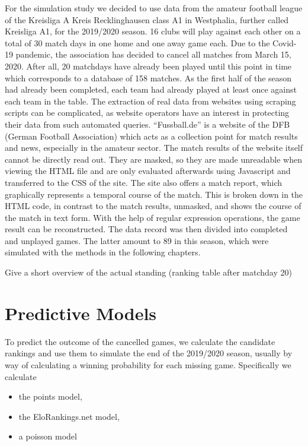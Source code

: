 \documentclass[12pt,a4paper]{article}
\begin{document}
For the simulation study we decided to use data from the amateur
football league of the Kreisliga A Kreis Recklinghausen class A1 in
Westphalia, further called Kreisliga A1, for the 2019/2020 season. 16
clubs will play against each other on a total of 30 match days in one
home and one away game each. Due to the Covid-19 pandemic, the
association has decided to cancel all matches from March 15, 2020. After
all, 20 matchdays have already been played until this point in time
which corresponds to a database of 158 matches. As the first half of the
season had already been completed, each team had already played at least
once against each team in the table. The extraction of real data from
websites using scraping scripts can be complicated, as website operators
have an interest in protecting their data from such automated queries.
\enquote{Fussball.de} is a website of the DFB (German Football
Association) which acts as a collection point for match results and
news, especially in the amateur sector. The match results of the website
itself cannot be directly read out. They are masked, so they are made
unreadable when viewing the HTML file and are only evaluated afterwards
using Javascript and transferred to the CSS of the site. The site also
offers a match report, which graphically represents a temporal course of
the match. This is broken down in the HTML code, in contrast to the
match results, unmasked, and shows the course of the match in text form.
With the help of regular expression operations, the game result can be
reconstructed. The data record was then divided into completed and
unplayed games. The latter amount to 89 in this season, which were
simulated with the methods in the following chapters.

Give a short overview of the actual standing (ranking table after
matchday 20)

\hypertarget{predictive-models}{%
\section{Predictive Models}\label{predictive-models}}

To predict the outcome of the cancelled games, we calculate the
candidate rankings and use them to simulate the end of the 2019/2020
season, usually by way of calculating a winning probability for each
missing game. Specifically we calculate

\begin{itemize}
\item the points model,
\item the EloRankings.net model, 
\item a poisson model
\end{itemize}
\end{document}
